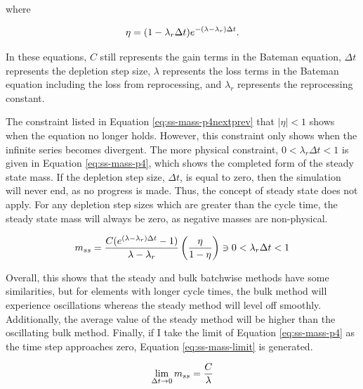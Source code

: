 where

\begin{equation} \hfill
\eta = (1 - \lambda_r \Delta t) e^{-(\lambda - \lambda_r) \Delta t}.
\hfill\label{eq:ss-mass-p4next-simple} \end{equation}

In these equations, $C$ still represents the gain terms in the Bateman equation, $\Delta t$ represents the depletion step size, $\lambda$ represents the loss terms in the Bateman equation including the loss from reprocessing, and $\lambda_r$ represents the reprocessing constant.

The constraint listed in Equation \eqref{eq:ss-mass-p4nextprev} that $\left|\eta \right| < 1$ shows when the equation no longer holds. However, this constraint only shows when the infinite series becomes divergent. The more physical constraint, $0 < \lambda_r \Delta t < 1$ is given in Equation \eqref{eq:ss-mass-p4}, which shows the completed form of the steady state mass. If the depletion step size, $\Delta t$, is equal to zero, then the simulation will never end, as no progress is made. Thus, the concept of steady state does not apply. For any depletion step sizes which are greater than the cycle time, the steady state mass will always be zero, as negative masses are non-physical.

\begin{equation} \hfill
m_{ss} = \frac{C (e^{(\lambda - \lambda_r) \Delta t} - 1)}{\lambda - \lambda_r}  \left( \frac{\eta}{1 - \eta} \right) \ni 0 < \lambda_r \Delta t < 1
\hfill\label{eq:ss-mass-p4} \end{equation}



Overall, this shows that the steady and bulk batchwise methods have some similarities, but for elements with longer cycle times, the bulk method will experience oscillations whereas the steady method will level off smoothly. Additionally, the average value of the steady method will be higher than the oscillating bulk method. Finally, if I take the limit of Equation \eqref{eq:ss-mass-p4} as the time step approaches zero, Equation \eqref{eq:ss-mass-limit} is generated.

\begin{equation} \hfill
\lim_{\Delta t \to 0} m_{ss} = \frac{C}{\lambda}
\hfill\label{eq:ss-mass-limit} \end{equation}

